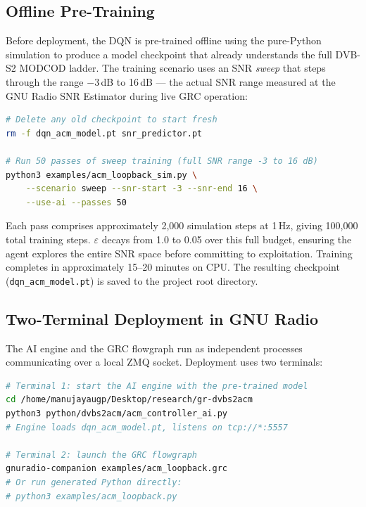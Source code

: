 \documentclass[12pt,a4paper]{report}
\begin{document}
\subsection{Offline Pre-Training}

Before deployment, the DQN is pre-trained offline using the pure-Python
simulation to produce a model checkpoint that already understands the full
DVB-S2 MODCOD ladder. The training scenario uses an SNR \emph{sweep} that
steps through the range $-3$\,dB to 16\,dB --- the actual SNR range measured
at the GNU Radio SNR Estimator during live GRC operation:

\begin{lstlisting}[language=bash, caption={Offline DQN pre-training command}]
# Delete any old checkpoint to start fresh
rm -f dqn_acm_model.pt snr_predictor.pt

# Run 50 passes of sweep training (full SNR range -3 to 16 dB)
python3 examples/acm_loopback_sim.py \
    --scenario sweep --snr-start -3 --snr-end 16 \
    --use-ai --passes 50
\end{lstlisting}

Each pass comprises approximately 2,000 simulation steps at 1\,Hz, giving
100,000 total training steps. $\varepsilon$ decays from 1.0 to 0.05 over
this full budget, ensuring the agent explores the entire SNR space before
committing to exploitation. Training completes in approximately 15--20 minutes
on CPU. The resulting checkpoint (\texttt{dqn\_acm\_model.pt}) is saved to
the project root directory.

\subsection{Two-Terminal Deployment in GNU Radio}

The AI engine and the GRC flowgraph run as independent processes communicating
over a local ZMQ socket. Deployment uses two terminals:

\begin{lstlisting}[language=bash, caption={Two-terminal deployment procedure}]
# Terminal 1: start the AI engine with the pre-trained model
cd /home/manujayaugp/Desktop/research/gr-dvbs2acm
python3 python/dvbs2acm/acm_controller_ai.py
# Engine loads dqn_acm_model.pt, listens on tcp://*:5557

# Terminal 2: launch the GRC flowgraph
gnuradio-companion examples/acm_loopback.grc
# Or run generated Python directly:
# python3 examples/acm_loopback.py
\end{lstlisting}
\end{document}
